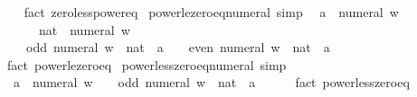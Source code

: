 \begin{isabellebody}
%
\isadelimproof
\ \ %
\endisadelimproof
%
\isatagproof
{}\isamarkupfalse%
\ {\isacharparenleft}{\kern0pt}fact\ zero{\isacharunderscore}{\kern0pt}less{\isacharunderscore}{\kern0pt}power{\isacharunderscore}{\kern0pt}eq{\isacharparenright}{\kern0pt}%
\endisatagproof
{\isafoldproof}%
%
\isadelimproof
\isanewline
%
\endisadelimproof
\isanewline
{}\isamarkupfalse%
\ power{\isacharunderscore}{\kern0pt}le{\isacharunderscore}{\kern0pt}zero{\isacharunderscore}{\kern0pt}eq{\isacharunderscore}{\kern0pt}numeral\ {\isacharbrackleft}{\kern0pt}simp{\isacharbrackright}{\kern0pt}{\isacharcolon}{\kern0pt}\isanewline
\ \ {\isachardoublequoteopen}a\ {\isacharcircum}{\kern0pt}\ numeral\ w\ {\isasymle}\ {}\ {\isasymlongleftrightarrow}\isanewline
\ \ \ \ {\isacharparenleft}{\kern0pt}{}\ {\isacharcolon}{\kern0pt}{\isacharcolon}{\kern0pt}\ nat{\isacharparenright}{\kern0pt}\ {\isacharless}{\kern0pt}\ numeral\ w\ {\isasymand}\isanewline
\ \ \ \ {\isacharparenleft}{\kern0pt}odd\ {\isacharparenleft}{\kern0pt}numeral\ w\ {\isacharcolon}{\kern0pt}{\isacharcolon}{\kern0pt}\ nat{\isacharparenright}{\kern0pt}\ {\isasymand}\ a\ {\isasymle}\ {}\ {\isasymor}\ even\ {\isacharparenleft}{\kern0pt}numeral\ w\ {\isacharcolon}{\kern0pt}{\isacharcolon}{\kern0pt}\ nat{\isacharparenright}{\kern0pt}\ {\isasymand}\ a\ {\isacharequal}{\kern0pt}\ {}{\isacharparenright}{\kern0pt}{\isachardoublequoteclose}\isanewline
%
\isadelimproof
\ \ %
\endisadelimproof
%
\isatagproof
{}\isamarkupfalse%
\ {\isacharparenleft}{\kern0pt}fact\ power{\isacharunderscore}{\kern0pt}le{\isacharunderscore}{\kern0pt}zero{\isacharunderscore}{\kern0pt}eq{\isacharparenright}{\kern0pt}%
\endisatagproof
{\isafoldproof}%
%
\isadelimproof
\isanewline
%
\endisadelimproof
\isanewline
{}\isamarkupfalse%
\ power{\isacharunderscore}{\kern0pt}less{\isacharunderscore}{\kern0pt}zero{\isacharunderscore}{\kern0pt}eq{\isacharunderscore}{\kern0pt}numeral\ {\isacharbrackleft}{\kern0pt}simp{\isacharbrackright}{\kern0pt}{\isacharcolon}{\kern0pt}\isanewline
\ \ {\isachardoublequoteopen}a\ {\isacharcircum}{\kern0pt}\ numeral\ w\ {\isacharless}{\kern0pt}\ {}\ {\isasymlongleftrightarrow}\ odd\ {\isacharparenleft}{\kern0pt}numeral\ w\ {\isacharcolon}{\kern0pt}{\isacharcolon}{\kern0pt}\ nat{\isacharparenright}{\kern0pt}\ {\isasymand}\ a\ {\isacharless}{\kern0pt}\ {}{\isachardoublequoteclose}\isanewline
%
\isadelimproof
\ \ %
\endisadelimproof
%
\isatagproof
{}\isamarkupfalse%
\ {\isacharparenleft}{\kern0pt}fact\ power{\isacharunderscore}{\kern0pt}less{\isacharunderscore}{\kern0pt}zero{\isacharunderscore}{\kern0pt}eq{\isacharparenright}{\kern0pt}%

\end{isabellebody}
